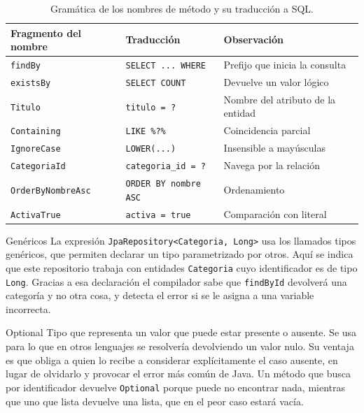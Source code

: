 \documentclass[11pt,a4paper,openany]{book}
\begin{document}
\begin{table}[htbp]
	\centering
	\caption{Gramática de los nombres de método y su traducción a SQL.}
	\label{tab:derivadas}
	\small
	\begin{tabularx}{\textwidth}{L{4.6cm} L{3.4cm} X}
		\toprule
		\textbf{Fragmento del nombre} & \textbf{Traducción} & \textbf{Observación} \\
		\midrule
		\texttt{findBy} & \texttt{SELECT ... WHERE} & Prefijo que inicia la consulta \\
		\texttt{existsBy} & \texttt{SELECT COUNT} & Devuelve un valor lógico \\
		\texttt{Titulo} & \texttt{titulo = ?} & Nombre del atributo de la entidad \\
		\texttt{Containing} & \texttt{LIKE \%?\%} & Coincidencia parcial \\
		\texttt{IgnoreCase} & \texttt{LOWER(...)} & Insensible a mayúsculas \\
		\texttt{CategoriaId} & \texttt{categoria\_id = ?} & Navega por la relación \\
		\texttt{OrderByNombreAsc} & \texttt{ORDER BY nombre ASC} & Ordenamiento \\
		\texttt{ActivaTrue} & \texttt{activa = true} & Comparación con literal \\
		\bottomrule
	\end{tabularx}
\end{table}

\begin{cajadefinicion}{Genéricos}
	La expresión \texttt{JpaRepository<Categoria, Long>} usa los llamados tipos genéricos, que permiten declarar un tipo parametrizado por otros. Aquí se indica que este repositorio trabaja con entidades \texttt{Categoria} cuyo identificador es de tipo \texttt{Long}. Gracias a esa declaración el compilador sabe que \texttt{findById} devolverá una categoría y no otra cosa, y detecta el error si se le asigna a una variable incorrecta.
\end{cajadefinicion}

\begin{cajadefinicion}{Optional}
	Tipo que representa un valor que puede estar presente o ausente. Se usa para lo que en otros lenguajes se resolvería devolviendo un valor nulo. Su ventaja es que obliga a quien lo recibe a considerar explícitamente el caso ausente, en lugar de olvidarlo y provocar el error más común de Java. Un método que busca por identificador devuelve \texttt{Optional} porque puede no encontrar nada, mientras que uno que lista devuelve una lista, que en el peor caso estará vacía.
\end{cajadefinicion}
\end{document}
